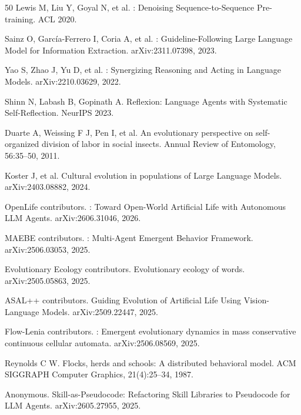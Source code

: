 \documentclass[twocolumn,10.5pt]{ctexart}
\begin{document}
\begin{thebibliography}{50}
Lewis M, Liu Y, Goyal N, et al.
: Denoising Sequence-to-Sequence Pre-training.
\newblock ACL 2020.

Sainz O, Garc{\'i}a-Ferrero I, Coria A, et al.
: Guideline-Following Large Language Model for Information Extraction.
\newblock arXiv:2311.07398, 2023.

Yao S, Zhao J, Yu D, et al.
: Synergizing Reasoning and Acting in Language Models.
\newblock arXiv:2210.03629, 2022.

Shinn N, Labash B, Gopinath A.
\newblock Reflexion: Language Agents with Systematic Self-Reflection.
\newblock NeurIPS 2023.

Duarte A, Weissing F J, Pen I, et al.
\newblock An evolutionary perspective on self-organized division of labor in social insects.
\newblock Annual Review of Entomology, 56:35--50, 2011.

Koster J, et al.
\newblock Cultural evolution in populations of Large Language Models.
\newblock arXiv:2403.08882, 2024.

OpenLife contributors.
: Toward Open-World Artificial Life with Autonomous LLM Agents.
\newblock arXiv:2606.31046, 2026.

MAEBE contributors.
: Multi-Agent Emergent Behavior Framework.
\newblock arXiv:2506.03053, 2025.

Evolutionary Ecology contributors.
\newblock Evolutionary ecology of words.
\newblock arXiv:2505.05863, 2025.

ASAL++ contributors.
\newblock Guiding Evolution of Artificial Life Using Vision-Language Models.
\newblock arXiv:2509.22447, 2025.

Flow-Lenia contributors.
: Emergent evolutionary dynamics in mass conservative continuous cellular automata.
\newblock arXiv:2506.08569, 2025.

Reynolds C W.
\newblock Flocks, herds and schools: A distributed behavioral model.
\newblock ACM SIGGRAPH Computer Graphics, 21(4):25--34, 1987.

Anonymous.
\newblock Skill-as-Pseudocode: Refactoring Skill Libraries to Pseudocode for {LLM} Agents.
\newblock arXiv:2605.27955, 2025.


\end{thebibliography}
\end{document}
